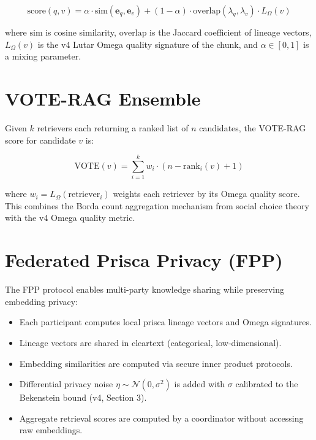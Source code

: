 \documentclass[11pt]{article}
\theoremstyle{plain}
\begin{document}
\begin{equation}
\text{score}(q, v) = \alpha \cdot \text{sim}(\mathbf{e}_q, \mathbf{e}_v) + (1-\alpha) \cdot \text{overlap}(\lambda_q, \lambda_v) \cdot L_\Omega(v)
\end{equation}

where \( \text{sim} \) is cosine similarity, \( \text{overlap} \) is the Jaccard coefficient of lineage vectors, \( L_\Omega(v) \) is the v4 Lutar Omega quality signature of the chunk, and \( \alpha \in [0,1] \) is a mixing parameter.


\section{VOTE-RAG Ensemble}

Given \( k \) retrievers each returning a ranked list of \( n \) candidates, the VOTE-RAG score for candidate \( v \) is:

\begin{equation}
\text{VOTE}(v) = \sum_{i=1}^{k} w_i \cdot (n - \text{rank}_i(v) + 1)
\end{equation}

where \( w_i = L_\Omega(\text{retriever}_i) \) weights each retriever by its Omega quality score. This combines the Borda count aggregation mechanism from social choice theory with the v4 Omega quality metric.


\section{Federated Prisca Privacy (FPP)}

The FPP protocol enables multi-party knowledge sharing while preserving embedding privacy:

\begin{itemize}
  \item Each participant computes local prisca lineage vectors and Omega signatures.
  \item Lineage vectors are shared in cleartext (categorical, low-dimensional).
  \item Embedding similarities are computed via secure inner product protocols.
  \item Differential privacy noise \( \eta \sim \mathcal{N}(0, \sigma^2) \) is added with \( \sigma \) calibrated to the Bekenstein bound (v4, Section 3).
  \item Aggregate retrieval scores are computed by a coordinator without accessing raw embeddings.
\end{itemize}
\end{document}

